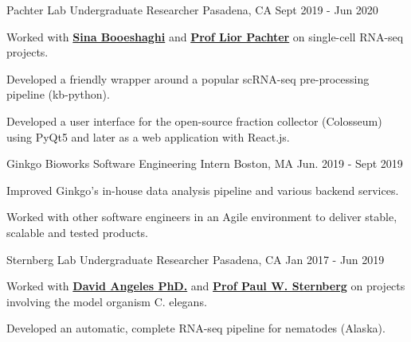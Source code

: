 \begin{cventries}
\cventry
  {Pachter Lab} %
  {Undergraduate Researcher} %
  {Pasadena, CA} %
  {Sept 2019 - Jun 2020} %
  {
    \begin{cvitems} %
      \item {Worked with \textbf{\href{https://sinabooeshaghi.com/}{Sina Booeshaghi}} and \textbf{\href{https://pachterlab.github.io/biography.html}{Prof Lior Pachter}} on single-cell RNA-seq projects.}
      \item {Developed a friendly wrapper around a popular scRNA-seq pre-processing pipeline (kb-python).}
      \item {Developed a user interface for the open-source fraction collector (Colosseum) using PyQt5 and later as a web application with React.js.}
    \end{cvitems}
  }

  \cventry
    {Ginkgo Bioworks} %
    {Software Engineering Intern} %
    {Boston, MA} %
    {Jun. 2019 - Sept 2019} %
    {
      \begin{cvitems} %
        \item {Improved Ginkgo's in-house data analysis pipeline and various backend services.}
        \item {Worked with other software engineers in an Agile environment to deliver stable, scalable and tested products.}
      \end{cvitems}
    }

\cventry
  {Sternberg Lab} %
  {Undergraduate Researcher} %
  {Pasadena, CA} %
  {Jan 2017 - Jun 2019} %
  {
    \begin{cvitems} %
      \item {Worked with \textbf{\href{https://dangeles.github.io/}{David Angeles PhD.}} and \textbf{\href{http://wormlab.caltech.edu/LabMembers/Paul}{Prof Paul W. Sternberg}} on projects involving the model organism C. elegans.}
      \item {Developed an automatic, complete RNA-seq pipeline for nematodes (Alaska).}
    \end{cvitems}
  }

\end{cventries}
